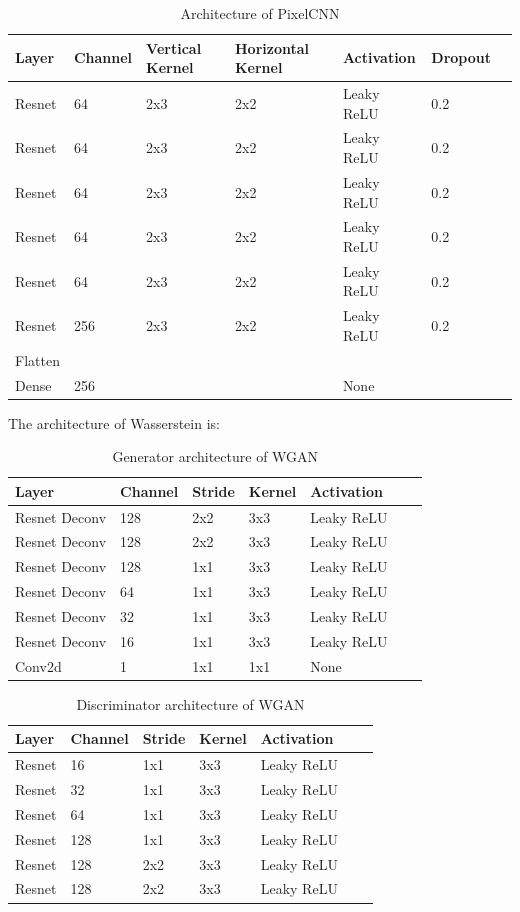 \documentclass[a3paper]{article}
\begin{document}
\begin{table}[H]
\centering
\begin{tabular}{lllllll}
Layer     & Channel & Vertical Kernel & Horizontal Kernel& Activation & Dropout  \\
\toprule
Resnet & 64 & 2x3 & 2x2 & Leaky ReLU & 0.2\\
Resnet & 64 & 2x3 & 2x2 & Leaky ReLU & 0.2\\
Resnet & 64 & 2x3 & 2x2 & Leaky ReLU & 0.2\\
Resnet & 64 & 2x3 & 2x2 & Leaky ReLU & 0.2\\
Resnet & 64 & 2x3 & 2x2 & Leaky ReLU & 0.2\\
Resnet & 256 & 2x3 & 2x2 & Leaky ReLU & 0.2\\
Flatten & \\
Dense & 256 &  &  & None \\
\bottomrule
\end{tabular}
\caption{Architecture of PixelCNN}
\end{table}


The architecture of Wasserstein is: 

\begin{table}[H]
\centering
\begin{tabular}{lllllll}
Layer     & Channel & Stride & Kernel & Activation  \\
\toprule
Resnet Deconv & 128 & 2x2 & 3x3 & Leaky ReLU \\
Resnet Deconv & 128 & 2x2 & 3x3 & Leaky ReLU \\
Resnet Deconv & 128 & 1x1 & 3x3 & Leaky ReLU \\
Resnet Deconv & 64 & 1x1 & 3x3 & Leaky ReLU \\
Resnet Deconv & 32 & 1x1 & 3x3 & Leaky ReLU \\
Resnet Deconv & 16 & 1x1 & 3x3 & Leaky ReLU \\
Conv2d & 1 & 1x1 & 1x1 & None \\
\bottomrule
\end{tabular}
\caption{Generator architecture of WGAN}
\end{table}

\begin{table}[H]
\centering
\begin{tabular}{lllllll}
Layer     & Channel & Stride & Kernel & Activation  \\
\toprule
Resnet & 16 & 1x1 & 3x3 & Leaky ReLU \\
Resnet & 32 & 1x1 & 3x3 & Leaky ReLU \\
Resnet & 64 & 1x1 & 3x3 & Leaky ReLU \\
Resnet & 128 & 1x1 & 3x3 & Leaky ReLU \\
Resnet & 128 & 2x2 & 3x3 & Leaky ReLU \\
Resnet & 128 & 2x2 & 3x3 & Leaky ReLU \\
\bottomrule
\end{tabular}
\caption{Discriminator architecture of WGAN}
\end{table}
\end{document}
